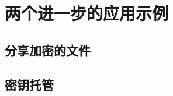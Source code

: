 \section{两个进一步的应用示例}\label{sec:11-1}

\subsection{分享加密的文件}\label{subsec:11-1-1}

\subsection{密钥托管}\label{subsec:11-1-2}